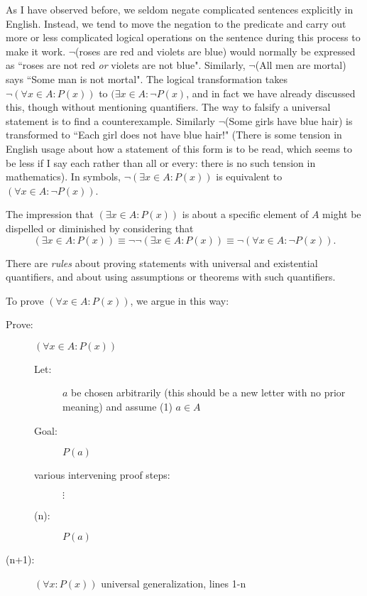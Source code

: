 \documentclass[12pt]{article}
\begin{document}
As I have observed before, we seldom negate complicated sentences explicitly in English.  Instead, we tend to move the negation to the predicate and carry out more or less complicated logical operations on the sentence during this process to make it work.  $\neg$(roses are red and violets are blue) would normally be expressed as ``roses are not red {\em or\/} violets are not blue".  Similarly, $\neg$(All men are mortal) says
``Some man is not mortal".  The logical transformation takes $\neg(\forall x\in A:P(x))$ to $(\exists x \in A:\neg P(x)$, and in fact we have already discussed this, though without mentioning quantifiers.  The way to falsify a universal statement is to find a counterexample.   Similarly
$\neg$(Some girls have blue hair) is transformed to ``Each girl does not have blue hair!" (There is some tension in English usage about how a statement of this form is to be read, which seems to be less if I say each rather than all or every:  there is no such tension in mathematics).  In symbols, $\neg(\exists x \in A:P(x))$ is equivalent to $(\forall x \in A:\neg P(x))$.

The impression that $(\exists x \in A:P(x))$ is about a specific element of $A$ might be dispelled or diminished by considering that
$$(\exists x \in A:P(x)) \equiv \neg\neg (\exists x \in A:P(x)) \equiv \neg(\forall x\in A : \neg P(x)).$$

There are {\em rules\/} about proving statements with universal and existential quantifiers, and about using assumptions or theorems with such quantifiers.

To prove $(\forall x \in A:P(x))$, we argue in this way:

\begin{description}
\item[Prove:]  $(\forall x \in A:P(x))$

\begin{description}

\item[Let:]  $a$ be chosen arbitrarily (this should be a new letter with no prior meaning) and assume (1) $a \in A$
\item[Goal:]  $P(a)$

\item[various intervening proof steps:] $\vdots$

\item[(n):]  $P(a)$

\end{description}

\item[(n+1):]  $(\forall x:P(x))$ universal generalization, lines 1-n

\end{description}
\end{document}
